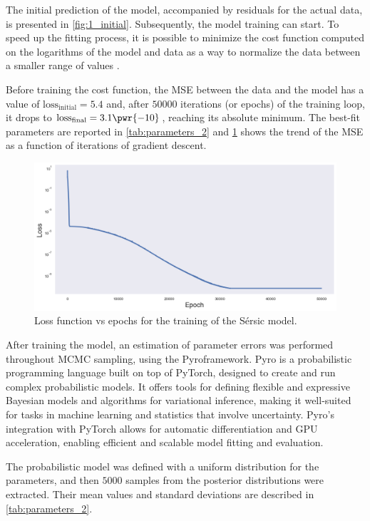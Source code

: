 The initial prediction of the model, accompanied by residuals for the actual data, is presented in \cref{fig:1_initial}. Subsequently, the model training can start. To speed up the fitting process, it is possible to minimize the cost function computed on the logarithms of the model and data as a way to normalize the data between a smaller range of values \citep{huang_normalization_2020}.

Before training the cost function, \ie the MSE between the data and the model has a value of $\mathrm{loss_{initial}} = 5.4$ and, after $50000$ iterations (or epochs) of the training loop, it drops to $\mathrm{loss_{final}} = 3.1\pwr{-10}$, reaching its absolute minimum. The best-fit parameters are reported in \cref{tab:parameters_2} and \cref{fig:loss_sersic} shows the trend of the MSE as a function of iterations of gradient descent.

\begin{figure}[]
    \centering
    \includegraphics[width=\linewidth]{img//chapter5//sersic/loss_sersic.png}
    \caption[Loss function vs epochs for Sérsic profile fit]{Loss function vs epochs for the training of the Sérsic model.}
    \label{fig:loss_sersic}
\end{figure}

After training the model, an estimation of parameter errors was performed throughout MCMC sampling, using the Pyroframework. Pyro is a probabilistic programming language built on top of PyTorch, designed to create and run complex probabilistic models. It offers tools for defining flexible and expressive Bayesian models and algorithms for variational inference, making it well-suited for tasks in machine learning and statistics that involve uncertainty. Pyro's integration with PyTorch allows for automatic differentiation and GPU acceleration, enabling efficient and scalable model fitting and evaluation.

The probabilistic model was defined with a uniform distribution for the parameters, and then $5000$ samples from the posterior distributions were extracted. Their mean values and standard deviations are described in \cref{tab:parameters_2}.


